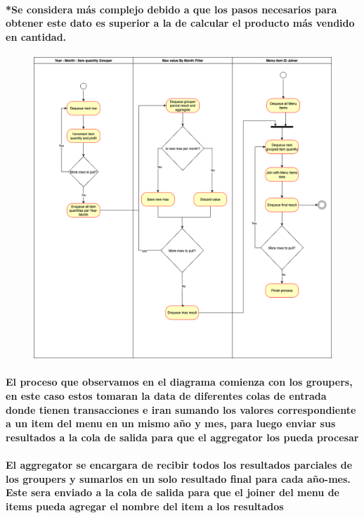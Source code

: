 \documentclass[titlepage,a4paper]{article}
\begin{document}
\paragraph{*Se considera más complejo debido a que los pasos necesarios para obtener este dato es superior a la de calcular el producto más vendido en cantidad.}
\begin{figure}[H]
    \centering
    \includegraphics[width=1\linewidth]{actividades.png}
\end{figure}
\paragraph{El proceso que observamos en el diagrama comienza con los groupers, en este caso estos tomaran la data de diferentes colas de entrada donde tienen transacciones e iran sumando los valores correspondiente a un item del menu en un mismo año y mes, para luego enviar sus resultados a la cola de salida para que el aggregator los pueda procesar}
\paragraph{El aggregator se encargara de recibir todos los resultados parciales de los groupers y sumarlos en un solo resultado final para cada año-mes. Este sera enviado a la cola de salida para que el joiner del menu de items pueda agregar el nombre del item a los resultados}
\end{document}
